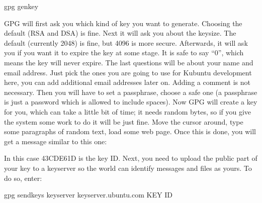 \documentclass[letterpaper,10pt,english]{sphinxmanual}
\begin{document}
\begin{sphinxVerbatim}[commandchars=\\\{\}]
\PYGZdl{} gpg \PYGZhy{}\PYGZhy{}gen\PYGZhy{}key
\end{sphinxVerbatim}

GPG will first ask you which kind of key you want to generate. Choosing the default (RSA and DSA) is fine. Next it will ask you about the keysize. The default (currently 2048) is fine, but 4096 is more secure. Afterwards, it will ask you if you want it to expire the key at some stage. It is safe to say “0”, which means the key will never expire. The last questions will be about your name and email address. Just pick the ones you are going to use for Kubuntu development here, you can add additional email addresses later on. Adding a comment is not necessary. Then you will have to set a passphrase, choose a safe one (a passphrase is just a password which is allowed to include spaces).
Now GPG will create a key for you, which can take a little bit of time; it needs random bytes, so if you give the system some work to do it will be just fine. Move the cursor around, type some paragraphs of random text, load some web page.
Once this is done, you will get a message similar to this one:

\begin{sphinxVerbatim}[commandchars=\\\{\}]
    
                   
     
    
\end{sphinxVerbatim}

In this case 43CDE61D is the key ID.
Next, you need to upload the public part of your key to a keyserver so the world can identify messages and files as yours. To do so, enter:

\begin{sphinxVerbatim}[commandchars=\\\{\}]
\PYGZdl{} gpg \PYGZhy{}\PYGZhy{}send\PYGZhy{}keys \PYGZhy{}\PYGZhy{}keyserver keyserver.ubuntu.com \PYGZlt{}KEY ID\PYGZgt{}
\end{sphinxVerbatim}
\end{document}
